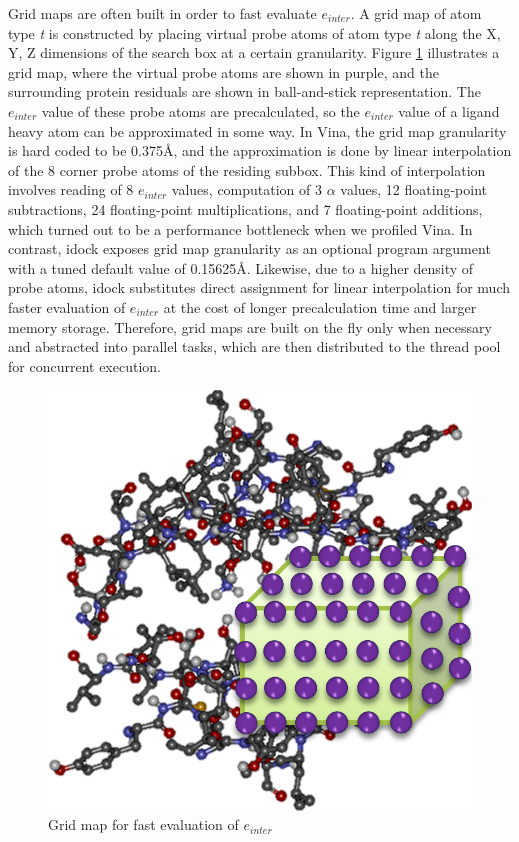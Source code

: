 Grid maps are often built in order to fast evaluate $e_{inter}$. A grid map of atom type \textit{t} is constructed by placing virtual probe atoms of atom type \textit{t} along the X, Y, Z dimensions of the search box at a certain granularity. Figure \ref{idock:GridMap} illustrates a grid map, where the virtual probe atoms are shown in purple, and the surrounding protein residuals are shown in ball-and-stick representation. The $e_{inter}$ value of these probe atoms are precalculated, so the $e_{inter}$ value of a ligand heavy atom can be approximated in some way. In Vina, the grid map granularity is hard coded to be 0.375\AA, and the approximation is done by linear interpolation of the 8 corner probe atoms of the residing subbox. This kind of interpolation involves reading of 8 $e_{inter}$ values, computation of 3 $\alpha$ values, 12 floating-point subtractions, 24 floating-point multiplications, and 7 floating-point additions, which turned out to be a performance bottleneck when we profiled Vina. In contrast, idock exposes grid map granularity as an optional program argument with a tuned default value of 0.15625\AA. Likewise, due to a higher density of probe atoms, idock substitutes direct assignment for linear interpolation for much faster evaluation of $e_{inter}$ at the cost of longer precalculation time and larger memory storage. Therefore, grid maps are built on the fly only when necessary and abstracted into parallel tasks, which are then distributed to the thread pool for concurrent execution.

\begin{figure}
\centering
\includegraphics[width=\linewidth]{../idock/GridMap.png}
\caption{Grid map for fast evaluation of $e_{inter}$}
\label{idock:GridMap}
\end{figure}

